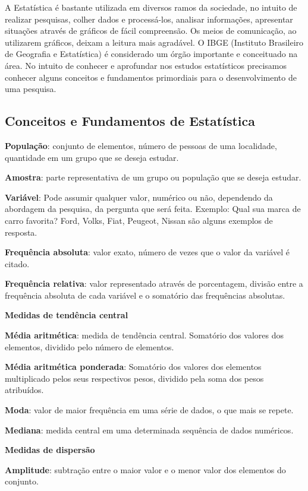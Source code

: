 \begin{multicols*}{2}
	A Estatística é bastante utilizada em diversos ramos da sociedade, no intuito de realizar pesquisas, colher dados e processá-los, analisar informações, apresentar situações através de gráficos de fácil compreensão. Os meios de comunicação, ao utilizarem gráficos, deixam a leitura mais agradável. O IBGE (Instituto Brasileiro de Geografia e Estatística) é considerado um órgão importante e conceituado na área. No intuito de conhecer e aprofundar nos estudos estatísticos precisamos conhecer alguns conceitos e fundamentos primordiais para o desenvolvimento de uma pesquisa.

	\subsection*{Conceitos e Fundamentos de Estatística}

	\textbf{População}: conjunto de elementos, número de pessoas de uma localidade, quantidade em um grupo que se deseja estudar.

	\textbf{Amostra}: parte representativa de um grupo ou população que se deseja estudar.

	\textbf{Variável}: Pode assumir qualquer valor, numérico ou não, dependendo da abordagem da pesquisa, da pergunta que será feita. Exemplo: Qual sua marca de carro favorita? Ford, Volks, Fiat, Peugeot, Nissan são alguns exemplos de resposta.

	\textbf{Frequência absoluta}: valor exato, número de vezes que o valor da variável é citado.

	\textbf{Frequência relativa}: valor representado através de porcentagem, divisão entre a frequência absoluta de cada variável e o somatório das frequências absolutas.

	\textbf{Medidas de tendência central}

	\textbf{Média aritmética}: medida de tendência central. Somatório dos valores dos elementos, dividido pelo número de elementos.

	\textbf{Média aritmética ponderada}: Somatório dos valores dos elementos multiplicado pelos seus respectivos pesos, dividido pela soma dos pesos atribuídos.

	\textbf{Moda}: valor de maior frequência em uma série de dados, o que mais se repete.

	\textbf{Mediana}: medida central em uma determinada sequência de dados numéricos.

	\textbf{Medidas de dispersão}

	\textbf{Amplitude}: subtração entre o maior valor e o menor valor dos elementos do conjunto.


\end{multicols*}
